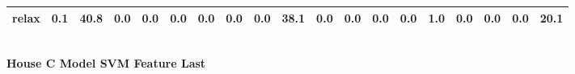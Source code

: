 \documentclass{article}
\begin{document}
\begin{sideways}
\begin{tabular}{lrrrrrrrrrrrrrrrrrr}
relax                         &         0.1 &               40.8 &           0.0 &                          0.0 &                0.0 &                0.0 &                        0.0 &          0.0 &             38.1 &                0.0 &                    0.0 &                      0.0 &                  0.0 &                   1.0 &              0.0 &              0.0 &                                  0.0 &         20.1 \\
\bottomrule
\end{tabular}
\end{sideways}
\normalsize
\vspace{1cm}\\
\textbf{House C Model SVM Feature Last}\\
\vspace{1cm}\\
\end{document}
